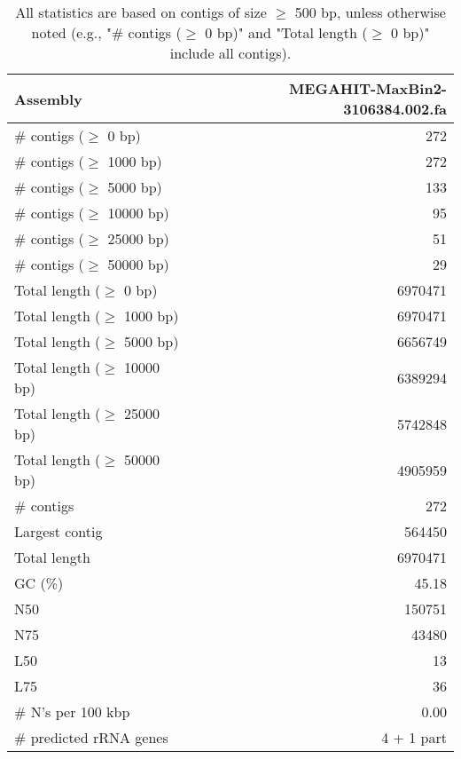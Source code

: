 \documentclass[12pt,a4paper]{article}
\begin{document}
\begin{table}[ht]
\begin{center}
\caption{All statistics are based on contigs of size $\geq$ 500 bp, unless otherwise noted (e.g., "\# contigs ($\geq$ 0 bp)" and "Total length ($\geq$ 0 bp)" include all contigs).}
\begin{tabular}{|l*{1}{|r}|}
\hline
Assembly & MEGAHIT-MaxBin2-3106384.002.fa \\ \hline
\# contigs ($\geq$ 0 bp) & 272 \\ \hline
\# contigs ($\geq$ 1000 bp) & 272 \\ \hline
\# contigs ($\geq$ 5000 bp) & 133 \\ \hline
\# contigs ($\geq$ 10000 bp) & 95 \\ \hline
\# contigs ($\geq$ 25000 bp) & 51 \\ \hline
\# contigs ($\geq$ 50000 bp) & 29 \\ \hline
Total length ($\geq$ 0 bp) & 6970471 \\ \hline
Total length ($\geq$ 1000 bp) & 6970471 \\ \hline
Total length ($\geq$ 5000 bp) & 6656749 \\ \hline
Total length ($\geq$ 10000 bp) & 6389294 \\ \hline
Total length ($\geq$ 25000 bp) & 5742848 \\ \hline
Total length ($\geq$ 50000 bp) & 4905959 \\ \hline
\# contigs & 272 \\ \hline
Largest contig & 564450 \\ \hline
Total length & 6970471 \\ \hline
GC (\%) & 45.18 \\ \hline
N50 & 150751 \\ \hline
N75 & 43480 \\ \hline
L50 & 13 \\ \hline
L75 & 36 \\ \hline
\# N's per 100 kbp & 0.00 \\ \hline
\# predicted rRNA genes & 4 + 1 part \\ \hline
\end{tabular}
\end{center}
\end{table}
\end{document}
